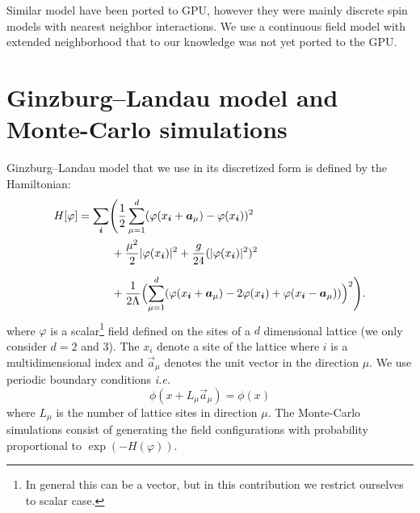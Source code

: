 \documentclass[a4paper]{llncs}
\renewcommand{\a}[1]{\v{a}_{#1}}
\renewcommand{\v}[1]{\vec{#1}}
\newcommand{\vphi}{\varphi}
\newcommand{\vi}{{\vec{i}}}
\newcommand{\ie}{{\textit{i.e.}}}
\begin{document}
Similar model have been
ported to GPU, however they were mainly discrete spin models with
nearest neighbor interactions\cite{spin1,spin2,weigel}.  We use a continuous field model
with extended neighborhood that to our knowledge was not yet ported to
the GPU.


\section{Ginzburg--Landau model and Monte-Carlo simulations}

Ginzburg--Landau model that we use in its discretized form is defined by the
Hamiltonian\cite{parisi}:
\begin{equation*}\label{eq:hamiltonian}\begin{split}
H[\varphi]&=\sum_{\vi}\Biggl(
\frac{1}{2}\sum_{\mu=1}^d(\vphi(x_\vi+\a{\mu})-\vphi(x_\vi))^2\\
&\phantom{=\sum_{\vi}\bigl(}+\frac{\mu^2}{2}|\vphi(x_{\vi})|^2+
\frac{g}{24}(|\vphi(x_{\vi})|^2)^2\\
&\phantom{=\sum_{\vi}\bigl(}+
\frac{1}{2\Lambda}\Bigl(\sum_{\mu=1}^d
(\vphi(x_\vi+\a{\mu})-2\vphi(x_{\vi})+\vphi(x_\vi-\a\mu))\Bigr)^2\Biggr).
\end{split}
\end{equation*}
where $\vphi$ is a scalar\footnote{In general this can be a vector,
  but in this contribution we restrict ourselves to scalar case.} field
defined on the sites of a $d$ dimensional lattice (we only consider $d=2$ and $3$). The $x_i$
denote a site of the lattice where $i$ is a multidimensional index
and $\a\mu$ denotes the unit vector in the direction $\mu$. We use
periodic boundary conditions \ie
\begin{equation} 
\phi(x+L_{\mu}\a\mu)=\phi(x)
\end{equation}
where  $L_\mu$ is the number of lattice sites in direction $\mu$. 
The Monte-Carlo simulations consist of
generating the field configurations with probability proportional to
$\exp(-H(\vphi))$.
\end{document}
